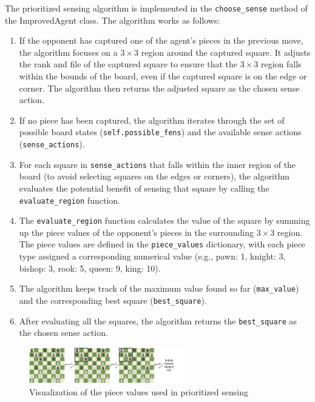 \documentclass[10pt]{article}
\begin{document}
The prioritized sensing algorithm is implemented in the \texttt{choose\_sense} method of the ImprovedAgent class. The algorithm works as follows:

\begin{enumerate}
    \item If the opponent has captured one of the agent's pieces in the previous move, the algorithm focuses on a $3\times3$ region around the captured square. It adjusts the rank and file of the captured square to ensure that the $3\times3$ region falls within the bounds of the board, even if the captured square is on the edge or corner. The algorithm then returns the adjusted square as the chosen sense action.
    
    \item If no piece has been captured, the algorithm iterates through the set of possible board states (\texttt{self.possible\_fens}) and the available sense actions (\texttt{sense\_actions}).
    
    \item For each square in \texttt{sense\_actions} that falls within the inner region of the board (to avoid selecting squares on the edges or corners), the algorithm evaluates the potential benefit of sensing that square by calling the \texttt{evaluate\_region} function.
    
    \item The \texttt{evaluate\_region} function calculates the value of the square by summing up the piece values of the opponent's pieces in the surrounding $3\times3$ region. The piece values are defined in the \texttt{piece\_values} dictionary, with each piece type assigned a corresponding numerical value (e.g., pawn: 1, knight: 3, bishop: 3, rook: 5, queen: 9, king: 10).
    
    \item The algorithm keeps track of the maximum value found so far (\texttt{max\_value}) and the corresponding best square (\texttt{best\_square}).
    
    \item After evaluating all the squares, the algorithm returns the \texttt{best\_square} as the chosen sense action.
\end{enumerate}

\begin{figure}[H]
  \centering
  \includegraphics[width=0.6\textwidth]{pieces.png}
  \caption{Visualization of the piece values used in prioritized sensing}
  \label{fig:pieces}
\end{figure}
\end{document}

